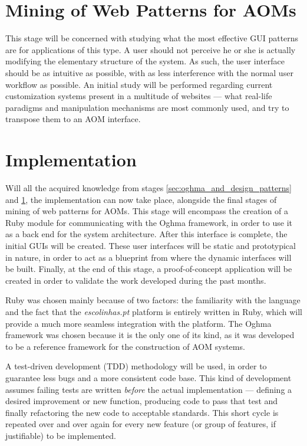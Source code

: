 \section{Mining of Web Patterns for AOMs}\label{sec:mining_of_web_patterns}

This stage will be concerned with studying what the most effective GUI patterns are for applications of this type. A user should not perceive he or she is actually modifying the elementary structure of the system. As such, the user interface should be as intuitive as possible, with as less interference with the normal user workflow as possible. An initial study will be performed regarding current customization systems present in a multitude of websites --- what real-life paradigms and manipulation mechanisms are most commonly used, and try to transpose them to an AOM interface.

\section{Implementation}\label{sec:implementation}

Will all the acquired knowledge from stages \ref{sec:oghma_and_design_patterns} and \ref{sec:mining_of_web_patterns}, the implementation can now take place, alongside the final stages of mining of web patterns for AOMs. This stage will encompass the creation of a Ruby module for communicating with the Oghma framework, in order to use it as a back end for the system architecture. After this interface is complete, the initial GUIs will be created. These user interfaces will be static and prototypical in nature, in order to act as a blueprint from where the dynamic interfaces will be built. Finally, at the end of this stage, a proof-of-concept application will be created in order to validate the work developed during the past months.

Ruby was chosen mainly because of two factors: the familiarity with the language and the fact that the \textit{escolinhas.pt} platform is entirely written in Ruby, which will provide a much more seamless integration with the platform. The Oghma framework was chosen because it is the only one of its kind, as it was developed to be a reference framework for the construction of AOM systems.

A test-driven development (TDD) methodology will be used, in order to guarantee less bugs and a more consistent code base. This kind of development assumes failing tests are written \emph{before} the actual implementation --- defining a desired improvement or new function, producing code to pass that test and finally refactoring the new code to acceptable standards. This short cycle is repeated over and over again for every new feature (or group of features, if justifiable) to be implemented.

